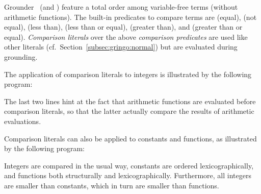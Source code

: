 Grounder \gringo\ (and \clingo)
feature a total order among variable-free terms (without arithmetic functions).
The built-in predicates to compare terms are
\code{=} (equal),
\code{!=} (not equal),
\code{<} (less than),
\code{<=} (less than or equal),
\code{>} (greater than), and
\code{>=} (greater than or equal).
\emph{Comparison literals} over the above \emph{comparison predicates} are used like
other literals (cf.\ Section~\ref{subsec:gringo:normal})
but are evaluated during grounding.

\begin{example}\label{ex:arith:pred}
The application of comparison literals to integers
is illustrated by the following program:%
%

%
The last two lines hint at the fact that arithmetic functions are evaluated
before comparison literals, so that the latter actually compare the
results of arithmetic evaluations.
\end{example}

\begin{example}\label{ex:symb:pred}
Comparison literals can also be applied to constants and functions,
as illustrated by the following program:%
%

%
Integers are compared in the usual way, constants are ordered lexicographically,
and functions both structurally and lexicographically.
Furthermore, all integers are smaller than constants,
which in turn are smaller than functions.
\end{example}

